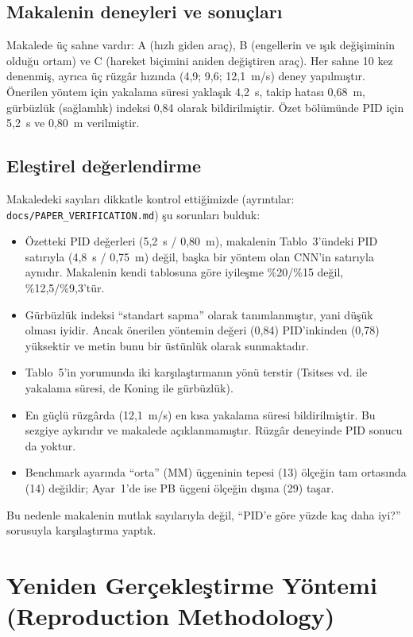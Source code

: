 \documentclass[conference,a4paper]{IEEEtran}
\begin{document}
\subsection{Makalenin deneyleri ve sonuçları}
Makalede üç sahne vardır: A (hızlı giden araç), B (engellerin ve ışık değişiminin olduğu ortam) ve C (hareket biçimini aniden değiştiren araç). Her sahne 10 kez denenmiş, ayrıca üç rüzgâr hızında (4,9; 9,6; 12,1~m/s) deney yapılmıştır. Önerilen yöntem için yakalama süresi yaklaşık 4,2~s, takip hatası 0,68~m, gürbüzlük (sağlamlık) indeksi 0,84 olarak bildirilmiştir. Özet bölümünde PID için 5,2~s ve 0,80~m verilmiştir.

\subsection{Eleştirel değerlendirme}
Makaledeki sayıları dikkatle kontrol ettiğimizde (ayrıntılar: \texttt{docs/PAPER\_VERIFICATION.md}) şu sorunları bulduk:
\begin{itemize}
\item Özetteki PID değerleri (5,2~s / 0,80~m), makalenin Tablo~3'ündeki PID satırıyla (4,8~s / 0,75~m) değil, başka bir yöntem olan CNN'in satırıyla aynıdır. Makalenin kendi tablosuna göre iyileşme \%20/\%15 değil, \%12,5/\%9,3'tür.
\item Gürbüzlük indeksi ``standart sapma'' olarak tanımlanmıştır, yani düşük olması iyidir. Ancak önerilen yöntemin değeri (0,84) PID'inkinden (0,78) yüksektir ve metin bunu bir üstünlük olarak sunmaktadır.
\item Tablo~5'in yorumunda iki karşılaştırmanın yönü terstir (Tsitses vd. ile yakalama süresi, de Koning ile gürbüzlük).
\item En güçlü rüzgârda (12,1~m/s) en kısa yakalama süresi bildirilmiştir. Bu sezgiye aykırıdır ve makalede açıklanmamıştır. Rüzgâr deneyinde PID sonucu da yoktur.
\item Benchmark ayarında ``orta'' (MM) üçgeninin tepesi (13) ölçeğin tam ortasında (14) değildir; Ayar~1'de ise PB üçgeni ölçeğin dışına (29) taşar.
\end{itemize}
Bu nedenle makalenin mutlak sayılarıyla değil, ``PID'e göre yüzde kaç daha iyi?'' sorusuyla karşılaştırma yaptık.

\section{Yeniden Gerçekleştirme Yöntemi (Reproduction Methodology)}
\end{document}
